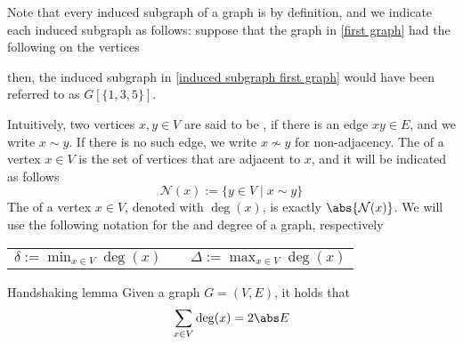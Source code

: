 \documentclass[a4paper, 12pt]{report}
\begin{document}
    Note that every induced subgraph of a graph is  by definition, and we indicate each induced subgraph as follows: suppose that the graph in \cref{first graph} had the following  on the vertices

    \begin{figure}[H]
        \centering
    \end{figure}

    then, the induced subgraph in \cref{induced subgraph first graph} would have been referred to as $G[\{1, 3, 5\}]$.

    Intuitively, two vertices $x, y \in V$ are said to be , if there is an edge $xy \in E$, and we write $x \sim y$. If there is no such edge, we write $x \nsim y$ for non-adjacency. The  of a vertex $x \in V$ is the set of vertices that are adjacent to $x$, and it will be indicated as follows $$\mathcal N (x) := \{y \in V \mid x \sim y\}$$ The  of a vertex $x \in V$, denoted with $\deg(x)$, is exactly $\abs{\mathcal N (x)}$. We will use the following notation for the  and  degree of a graph, respectively

    \begin{center}
        \begin{tabular}{ccc}
            $\displaystyle \delta := \min_{x \in V}{\deg(x)}$ & \qquad & $\displaystyle \Delta := \max_{x \in V}{\deg(x)}$
        \end{tabular}
    \end{center}

    \begin{framedlem}{Handshaking lemma}
        Given a graph $G = (V, E)$, it holds that $$\sum_{x \in V}{\deg(x)} = 2 \abs E$$
    \end{framedlem}
\end{document}
